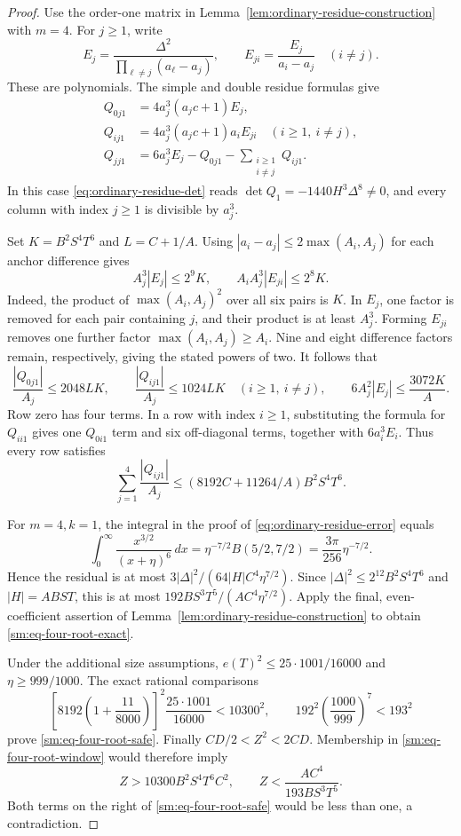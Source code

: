 \documentclass[12pt]{article}
\numberwithin{equation}{section}
\begin{document}
\begin{proof}
Use the order-one matrix in Lemma~\ref{lem:ordinary-residue-construction}
with \(m=4\). For \(j\ge1\), write
\[
 E_j=\frac{\Delta^2}{\prod_{\ell\ne j}(a_\ell-a_j)},\qquad
 E_{ji}=\frac{E_j}{a_i-a_j}\quad(i\ne j).
\]
These are polynomials. The simple and double residue formulas give
\begin{align*}
 Q_{0j1}&=4a_j^3(a_jc+1)E_j,\\
 Q_{ij1}&=4a_j^3(a_jc+1)a_iE_{ji}\quad(i\ge1,\ i\ne j),\\
 Q_{jj1}&=6a_j^3E_j-Q_{0j1}-\sum_{\substack{i\ge1\\i\ne j}}Q_{ij1}.
\end{align*}
In this case \eqref{eq:ordinary-residue-det} reads
\(\det Q_1=-1440H^3\Delta^8\ne0\), and every column with index $j\ge1$
is divisible by \(a_j^3\).

Set \(K=B^2S^4T^6\) and \(L=C+1/A\). Using $|a_i-a_j|\le2\max(A_i,A_j)$ for each anchor difference gives
\[
 A_j^3|E_j|\le2^9K,\qquad
 A_iA_j^3|E_{ji}|\le2^8K.
\]
Indeed, the product of \(\max(A_i,A_j)^2\) over all six pairs is
\(K\). In \(E_j\), one factor is removed for each pair containing
\(j\), and their product is at least \(A_j^3\). Forming \(E_{ji}\)
removes one further factor \(\max(A_i,A_j)\ge A_i\). Nine and eight
difference factors remain, respectively, giving the stated powers of two.
It follows that
\[
 \frac{|Q_{0j1}|}{A_j}\le2048LK,\qquad
 \frac{|Q_{ij1}|}{A_j}\le1024LK\quad(i\ge1,\ i\ne j),
 \qquad 6A_j^2|E_j|\le\frac{3072K}{A}.
\]
Row zero has four terms. In a row with index $i\ge1$, substituting the formula for $Q_{ii1}$
gives one $Q_{0i1}$ term and six off-diagonal terms, together with
$6a_i^3E_i$. Thus every row satisfies
\[
 \sum_{j=1}^4\frac{|Q_{ij1}|}{A_j}
 \le(8192C+11264/A)B^2S^4T^6.
\]

For \(m=4,k=1\), the integral in the proof of
\eqref{eq:ordinary-residue-error} equals
\[
 \int_0^\infty\frac{x^{3/2}}{(x+\eta)^6}\,dx
 =\eta^{-7/2}B(5/2,7/2)
 =\frac{3\pi}{256}\eta^{-7/2}.
\]
Hence the residual is at most
\(3|\Delta|^2/(64|H|C^4\eta^{7/2})\).
Since \(|\Delta|^2\le2^{12}B^2S^4T^6\) and \(|H|=ABST\),
this is at most \(192BS^3T^5/(AC^4\eta^{7/2})\).
Apply the final, even-coefficient assertion of
Lemma~\ref{lem:ordinary-residue-construction} to obtain
\eqref{sm:eq-four-root-exact}.

Under the additional size assumptions,
\(e(T)^2\le25\cdot1001/16000\) and \(\eta\ge999/1000\).
The exact rational comparisons
\[
 \left[8192\left(1+\frac{11}{8000}\right)\right]^2
 \frac{25\cdot1001}{16000}<10300^2,
 \qquad
 192^2\left(\frac{1000}{999}\right)^7<193^2
\]
prove \eqref{sm:eq-four-root-safe}.
Finally \(CD/2<Z^2<2CD\). Membership in
\eqref{sm:eq-four-root-window} would therefore imply
\[
 Z>10300B^2S^4T^6C^2,\qquad
 Z<\frac{AC^4}{193BS^3T^5}.
\]
Both terms on the right of \eqref{sm:eq-four-root-safe} would be less
than one, a contradiction.
\end{proof}
\end{document}
